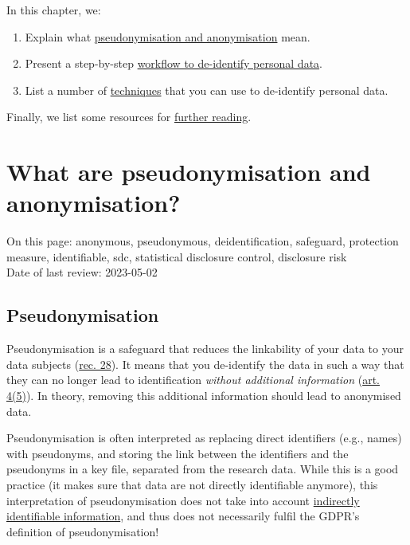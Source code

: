 \documentclass[
]{book}
\providecommand{\tightlist}{%
  \setlength{\itemsep}{0pt}\setlength{\parskip}{0pt}}
\begin{document}
In this chapter, we:

\begin{enumerate}
\def\labelenumi{\arabic{enumi}.}
\tightlist
\item
  Explain what \protect\hyperlink{definition-anonymisation-pseudonymisation}{pseudonymisation and anonymisation}
  mean.
\item
  Present a step-by-step
  \protect\hyperlink{deidentification-workflow}{workflow to de-identify personal data}.
\item
  List a number of \protect\hyperlink{deidentification-techniques}{techniques} that you can use
  to de-identify personal data.
\end{enumerate}

Finally, we list some resources for \protect\hyperlink{deidentification-resources}{further reading}.

\hypertarget{definition-anonymisation-pseudonymisation}{%
\section{What are pseudonymisation and anonymisation?}\label{definition-anonymisation-pseudonymisation}}

On this page: anonymous, pseudonymous, deidentification, safeguard, protection
measure, identifiable, sdc, statistical disclosure control, disclosure risk\\
Date of last review: 2023-05-02

\hypertarget{pseudonymisation}{%
\subsection{Pseudonymisation}\label{pseudonymisation}}

Pseudonymisation is a safeguard that reduces the linkability of your data to
your data subjects (\href{https://gdpr-info.eu/recitals/no-28/}{rec. 28}).
It means that you de-identify the data in such a way that they can no longer
lead to identification \emph{without additional information}
(\href{https://gdpr-info.eu/art-4-gdpr/}{art. 4(5)}). In theory,
removing this additional information should lead to anonymised data.

Pseudonymisation is often interpreted as replacing direct
identifiers (e.g., names) with pseudonyms, and storing the link between the
identifiers and the pseudonyms in a key file, separated from the research data.
While this is a good practice (it makes sure that data are not directly
identifiable anymore), this interpretation of pseudonymisation does not take
into account \protect\hyperlink{when-anonymous}{indirectly identifiable information}, and thus
does not necessarily fulfil the GDPR's definition of pseudonymisation!
\end{document}
